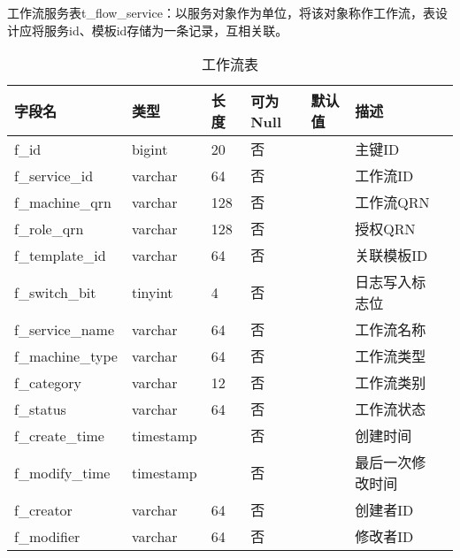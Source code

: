 工作流服务表t\_flow\_service：以服务对象作为单位，将该对象称作工作流，表设计应将服务id、模板id存储为一条记录，互相关联。
\begin{table}[H]
    \centering
    \caption{工作流表}
    \label{tab:t_flow_service}
    \begin{tabular}{lllllll}
        \toprule
        字段名	&类型	&长度	&可为Null&默认值	&描述 \\
        \midrule
        f\_id	&bigint	&20 &否&& 主键ID\\
        f\_service\_id	&varchar	&64 &否&& 工作流ID\\
        f\_machine\_qrn	&varchar	&128 &否&& 工作流QRN\\
        f\_role\_qrn	&varchar	&128 &否&& 授权QRN\\
        f\_template\_id	&varchar	&64 &否&& 关联模板ID\\
        f\_switch\_bit	&tinyint	&4 &否&& 日志写入标志位\\
        f\_service\_name	&varchar	&64 &否&& 工作流名称\\
        f\_machine\_type	&varchar	&64 &否&& 工作流类型\\
        f\_category	&varchar	&12 &否&& 工作流类别\\
        f\_status	&varchar	&64 &否&& 工作流状态\\
        f\_create\_time	&timestamp & &否&& 创建时间\\
        f\_modify\_time   &timestamp & &否&& 最后一次修改时间\\
        f\_creator	&varchar	&64 &否&& 创建者ID\\
        f\_modifier	&varchar	&64 &否&& 修改者ID\\
        \bottomrule
    \end{tabular}
\end{table}

